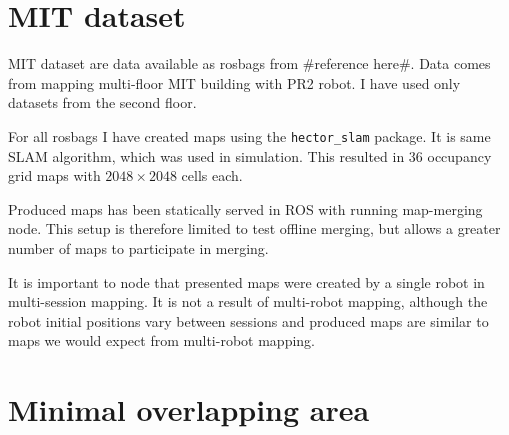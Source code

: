 \section{\gls{MIT} dataset}

\gls{MIT} dataset are data available as rosbags from \#reference here\#. Data comes from mapping multi-floor \gls{MIT} building with PR2 robot. I have used only datasets from the second floor.

For all rosbags I have created maps using the \texttt{hector\_slam} package. It is same \gls{SLAM} algorithm, which was used in simulation. This resulted in $36$ occupancy grid maps with $2048 \times 2048$ cells each.

Produced maps has been statically served in \gls{ROS} with running map-merging node. This setup is therefore limited to test offline merging, but allows a greater number of maps to participate in merging.

It is important to node that presented maps were created by a single robot in multi-session mapping. It is not a result of multi-robot mapping, although the robot initial positions vary between sessions and produced maps are similar to maps we would expect from multi-robot mapping.

\section{Minimal overlapping area}

